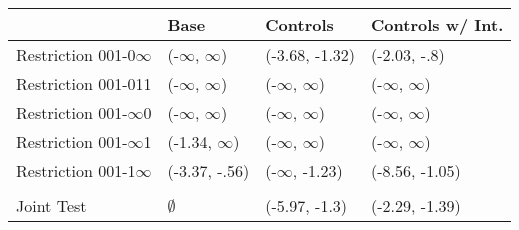 \begin{tabular}{llll}
\toprule
{} &           Base &        Controls & Controls w/ Int. \\
\midrule
Restriction 001-0$\infty$ &      (-$\infty$, $\infty$) &  (-3.68, -1.32) &     (-2.03, -.8) \\
Restriction 001-011 &      (-$\infty$, $\infty$) &       (-$\infty$, $\infty$) &        (-$\infty$, $\infty$) \\
Restriction 001-$\infty$0 &      (-$\infty$, $\infty$) &       (-$\infty$, $\infty$) &        (-$\infty$, $\infty$) \\
Restriction 001-$\infty$1 &    (-1.34, $\infty$) &       (-$\infty$, $\infty$) &        (-$\infty$, $\infty$) \\
Restriction 001-1$\infty$ &  (-3.37, -.56) &    (-$\infty$, -1.23) &   (-8.56, -1.05) \\
\hline\\Joint Test  &         $\emptyset$ &   (-5.97, -1.3) &   (-2.29, -1.39) \\
\bottomrule
\end{tabular}
